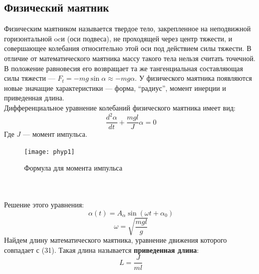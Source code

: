 \subsection*{Физический маятник}
Физическим маятником называется твердое тело, закрепленное на неподвижной горизонтальной ocи (оси подвеса), не проходящей через центр тяжести, и совершающее колебания относительно этой оси под действием силы тяжести. В отличие от математического маятника массу такого тела нельзя считать точечной. В положение равновесия его возвращает та же тангенциальная составляющая силы тяжести --- $F_t = -mg\sin\alpha \approx -mg\alpha $. У физического маятника появляются новые значащие характеристики --- форма, ``радиус'', момент инерции и приведенная длина.\\
Дифференциальное уравнение колебаний физического маятника имеет вид:
\begin{equation}
\frac{d^2\alpha}{dt} + \frac{mgl}{J}\alpha = 0
\end{equation}
Где $J$ --- момент импульса.
\begin{figure}[h!]
	\centering
	\texttt{[image: phyp1]}\\
	\caption{Формула для момента импульса}
\end{figure} \\ \\
Решение этого уравнения:
\begin{equation}
\alpha(t) = A_\alpha\sin(\omega t + \alpha_0)
\end{equation}
\begin{equation}
\omega = \sqrt {\frac{mgl}{g}}
\end{equation}
Найдем длину математического маятника, уравнение движения которого совпадает с (31). Такая длина называется \textbf{приведенная длина}:
\begin{equation}
L = \frac{J}{ml}
\end{equation}

